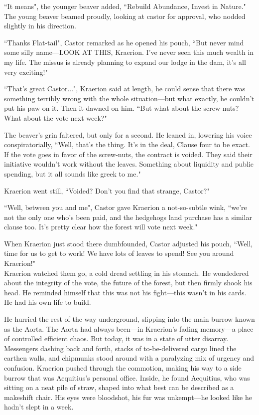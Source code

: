``It means", the younger beaver added, ``Rebuild Abundance, Invest in Nature." The young beaver beamed proudly, looking at castor for approval, who nodded slightly in his direction.

``Thanks Flat-tail", Castor remarked as he opened his pouch, ``But never mind some silly name---LOOK AT THIS, Kraerion. I've never seen this much wealth in my life. The missus is already planning to expand our lodge in the dam, it's all very exciting!"

``That's great Castor...", Kraerion said at length, he could sense that there was something terribly wrong with the whole situation---but what exactly, he couldn't put his paw on it. Then it dawned on him. ``But what about the screw-nuts? What about the vote next week?"

The beaver's grin faltered, but only for a second. He leaned in, lowering his voice conspiratorially, ``Well, that's the thing. It's in the deal, Clause four to be exact. If the vote goes in favor of the screw-nuts, the contract is voided. They said their initiative wouldn't work without the leaves. Something about liquidity and public spending, but it all sounds like greek to me."

Kraerion went still, ``Voided? Don't you find that strange, Castor?"

``Well, between you and me", Castor gave Kraerion a not-so-subtle wink, ``we're not the only one who's been paid, and the hedgehogs land purchase has a similar clause too. It's pretty clear how the forest will vote next week."

When Kraerion just stood there dumbfounded, Castor adjusted his pouch, ``Well, time for us to get to work! We have lots of leaves to spend! See you around Kraerion!"\\

Kraerion watched them go, a cold dread settling in his stomach. He wondedered about the integrity of the vote, the future of the forest, but then firmly shook his head.
He reminded himself that this was not his fight---this wasn't in his cards. He had his own life to build.

He hurried the rest of the way underground, slipping into the main burrow known as the Aorta. The Aorta had always been---in Kraerion's fading memory---a place of controlled efficient chaos. But today, it was in a state of utter disarray. Messengers dashing back and forth, stacks of to-be-delivered cargo lined the earthen walls, and chipmunks stood around with a paralyzing mix of urgency and confusion.
Kraerion pushed through the commotion, making his way to a side burrow that was Aequitius's personal office. Inside, he found Aequitius, who was sitting on a neat pile of straw, shaped into what best can be described as a makeshift chair. His eyes were bloodshot, his fur was unkempt---he looked like he hadn't slept in a week.

